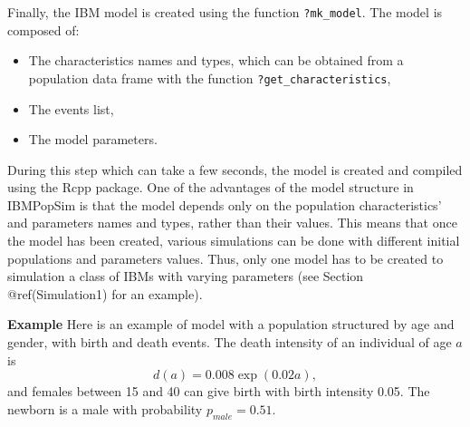 Finally, the IBM model is created using the function \texttt{?mk\_model}. The model is composed of:

\begin{itemize}
\tightlist
\item
  The characteristics names and types, which can be obtained from a population data frame with the function \texttt{?get\_characteristics},
\item
  The events list,
\item
  The model parameters.
\end{itemize}

\begin{Shaded}
\begin{Highlighting}[]
\StringTok{ }\NormalTok{(} 
\end{Highlighting}
\end{Shaded}

During this step which can take a few seconds, the model is created and compiled using the Rcpp package.
One of the advantages of the model structure in IBMPopSim is that the model depends only on the population characteristics' and parameters names and types, rather than their values.
This means that once the model has been created, various simulations can be done with different initial populations and parameters values. Thus, only one model has to be created to simulation a class of IBMs with varying parameters (see Section @ref(Simulation1) for an example).

\textbf{Example} Here is an example of model with a population structured by age and gender, with birth and death events. The death intensity of an individual of age \(a\) is
\[d(a) = 0.008 \exp(0.02a),\]
and females between 15 and 40 can give birth with birth intensity 0.05. The newborn is a male with probability \(p_{male}= 0.51\).

